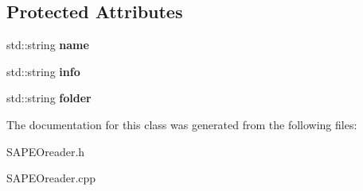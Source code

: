 \subsection*{Protected Attributes}
\begin{DoxyCompactItemize}
\item 
std\+::string {\bfseries name}\hypertarget{classCocoOptimiser_a6832a1c556a6af0f47b0e1de31fc7488}{}\label{classCocoOptimiser_a6832a1c556a6af0f47b0e1de31fc7488}

\item 
std\+::string {\bfseries info}\hypertarget{classCocoOptimiser_a01d71a1cc52374efb3d9e0b4c80e44e7}{}\label{classCocoOptimiser_a01d71a1cc52374efb3d9e0b4c80e44e7}

\item 
std\+::string {\bfseries folder}\hypertarget{classCocoOptimiser_a92f48d32c1606ebee1f3d4d432553f4c}{}\label{classCocoOptimiser_a92f48d32c1606ebee1f3d4d432553f4c}

\end{DoxyCompactItemize}


The documentation for this class was generated from the following files\+:\begin{DoxyCompactItemize}
\item 
S\+A\+P\+E\+Oreader.\+h\item 
S\+A\+P\+E\+Oreader.\+cpp\end{DoxyCompactItemize}
